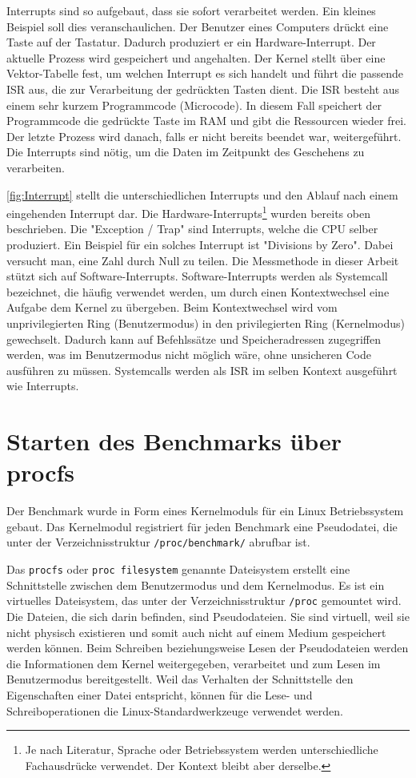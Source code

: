 Interrupts sind so aufgebaut, dass sie sofort verarbeitet werden. Ein kleines Beispiel soll dies veranschaulichen. Der Benutzer eines Computers drückt eine Taste auf der Tastatur. Dadurch produziert er ein Hardware-Interrupt. Der aktuelle Prozess wird gespeichert und angehalten. Der Kernel stellt über eine Vektor-Tabelle fest, um welchen Interrupt es sich handelt und führt die passende ISR aus, die zur Verarbeitung der gedrückten Tasten dient. Die ISR besteht aus einem sehr kurzem Programmcode (Microcode). In diesem Fall speichert der Programmcode die gedrückte Taste im RAM und gibt die Ressourcen wieder frei. Der letzte Prozess wird danach, falls er nicht bereits beendet war, weitergeführt. Die Interrupts sind nötig, um die Daten im Zeitpunkt des Geschehens zu verarbeiten.
\par

\autoref{fig:Interrupt} stellt die unterschiedlichen Interrupts und den Ablauf nach einem eingehenden Interrupt dar. Die Hardware-Interrupts\footnote{Je nach Literatur, Sprache oder Betriebssystem werden unterschiedliche Fachausdrücke verwendet. Der Kontext bleibt aber derselbe.} wurden bereits oben beschrieben. Die "Exception / Trap" sind Interrupts, welche die CPU selber produziert. Ein Beispiel für ein solches Interrupt ist "Divisions by Zero". Dabei versucht man, eine Zahl durch Null zu teilen. Die Messmethode in dieser Arbeit stützt sich auf Software-Interrupts. Software-Interrupts werden als Systemcall bezeichnet, die häufig verwendet werden, um durch einen Kontextwechsel eine Aufgabe dem Kernel zu übergeben. Beim Kontextwechsel wird vom unprivilegierten Ring (Benutzermodus) in den privilegierten Ring (Kernelmodus) gewechselt. Dadurch kann auf Befehlssätze und Speicheradressen zugegriffen werden, was im Benutzermodus nicht möglich wäre, ohne unsicheren Code ausführen zu müssen. Systemcalls werden als ISR im selben Kontext ausgeführt wie Interrupts.




\section{Starten des Benchmarks über procfs}

Der Benchmark wurde in Form eines Kernelmoduls für ein Linux Betriebssystem gebaut. Das Kernelmodul registriert für jeden Benchmark eine Pseudodatei, die unter der Verzeichnisstruktur \texttt{/proc/benchmark/} abrufbar ist.
\par
Das \texttt{procfs} oder \texttt{proc filesystem} genannte Dateisystem erstellt eine Schnittstelle zwischen dem Benutzermodus und dem Kernelmodus. Es ist ein virtuelles Dateisystem, das unter der Verzeichnisstruktur \texttt{/proc} gemountet wird\cite{mauerer2010professional}. Die Dateien, die sich darin befinden, sind Pseudodateien. Sie sind virtuell, weil sie nicht physisch existieren und somit auch nicht auf einem Medium gespeichert werden können. Beim Schreiben beziehungsweise Lesen der Pseudodateien werden die Informationen dem Kernel weitergegeben, verarbeitet und zum Lesen im Benutzermodus bereitgestellt. Weil das Verhalten der Schnittstelle den Eigenschaften einer Datei entspricht, können für die Lese- und Schreiboperationen die Linux-Standardwerkzeuge verwendet werden.

